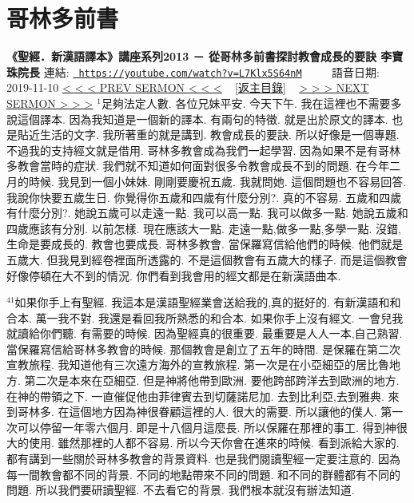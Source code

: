 \documentclass{book}
\begin{document}
\section{哥林多前書}
\label{sec:L7Klx5S64nM}
\textbf{《聖經．新漢語譯本》講座系列2013 － 從哥林多前書探討教會成長的要訣 李寶珠院長}
\newline
\newline
連結: \href{https://youtube.com/watch?v=L7Klx5S64nM}{\texttt{ https://youtube.com/watch?v=L7Klx5S64nM}} ~~~~ 語音日期: 2019-11-10 
\newline
\newline
\hyperref[sec:9gWlq_OvVJU]{\small{< < < PREV SERMON < < <}}
~
\hyperref[sec:index]{\small{[返主目錄]}}
~
\hyperref[sec:WEwyO2xJwfc]{\small{> > > NEXT SERMON > > >}}
\newline
\newline
$^{1}$足夠法定人數.
各位兄妹平安.
今天下午.
我在這裡也不需要多說這個譯本.
因為我知道是一個新的譯本.
有兩句的特徵.
就是出於原文的譯本.
也是貼近生活的文字.
我所著重的就是講到.
教會成長的要訣.
所以好像是一個專題.
不過我的支持經文就是借用.
哥林多教會成為我們一起學習.
因為如果不是有哥林多教會當時的症狀.
我們就不知道如何面對很多令教會成長不到的問題.
在今年二月的時候.
我見到一個小妹妹.
剛剛要慶祝五歲.
我就問她.
這個問題也不容易回答.
我說你快要五歲生日.
你覺得你五歲和四歲有什麼分別?.
真的不容易.
五歲和四歲有什麼分別?.
她說五歲可以走遠一點.
我可以高一點.
我可以做多一點.
她說五歲和四歲應該有分別.
以前怎樣.
現在應該大一點.
走遠一點,做多一點,多學一點.
沒錯,生命是要成長的.
教會也要成長.
哥林多教會.
當保羅寫信給他們的時候.
他們就是五歲大.
但我見到經卷裡面所透露的.
不是這個教會有五歲大的樣子.
而是這個教會好像停頓在大不到的情況.
你們看到我會用的經文都是在新漢語曲本.

$^{41}$如果你手上有聖經.
我這本是漢語聖經業會送給我的,真的挺好的.
有新漢語和和合本.
萬一我不對.
我還是看回我所熟悉的和合本.
如果你手上沒有經文.
一會兒我就讀給你們聽.
有需要的時候.
因為聖經真的很重要.
最重要是人人一本,自己熟習.
當保羅寫信給哥林多教會的時候.
那個教會是創立了五年的時間.
是保羅在第二次宣教旅程.
我知道他有三次遠方海外的宣教旅程.
第一次是在小亞細亞的居比魯地方.
第二次是本來在亞細亞.
但是神將他帶到歐洲.
要他跨部跨洋去到歐洲的地方.
在神的帶領之下.
一直催促他由菲律賓去到切薩諾尼加.
去到比利亞,去到雅典.
來到哥林多.
在這個地方因為神很眷顧這裡的人.
很大的需要.
所以讓他的僕人.
第一次可以停留一年零六個月.
即是十八個月這麼長.
所以保羅在那裡的事工.
得到神很大的使用.
雖然那裡的人都不容易.
所以今天你會在進來的時候.
看到派給大家的.
都有講到一些關於哥林多教會的背景資料.
也是我們閱讀聖經一定要注意的.
因為每一間教會都不同的背景.
不同的地點帶來不同的問題.
和不同的群體都有不同的問題.
所以我們要研讀聖經.
不去看它的背景.
我們根本就沒有辦法知道.
\end{document}
